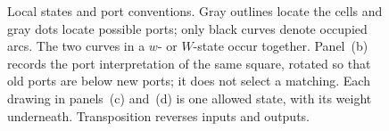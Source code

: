 \begin{figure}[tbp]
\endgroup
\caption{Local states and port conventions. Gray outlines locate the cells
and gray dots locate possible ports; only black curves denote occupied
arcs. The two curves in a $w$- or $W$-state occur together. Panel~(b)
records the port interpretation of the same square, rotated so that old
ports are below new ports; it does not select a matching. Each drawing in
panels~(c) and~(d) is one allowed state, with its weight underneath.
Transposition reverses inputs and outputs.}
\label{L:fig:local-states}
\end{figure}
